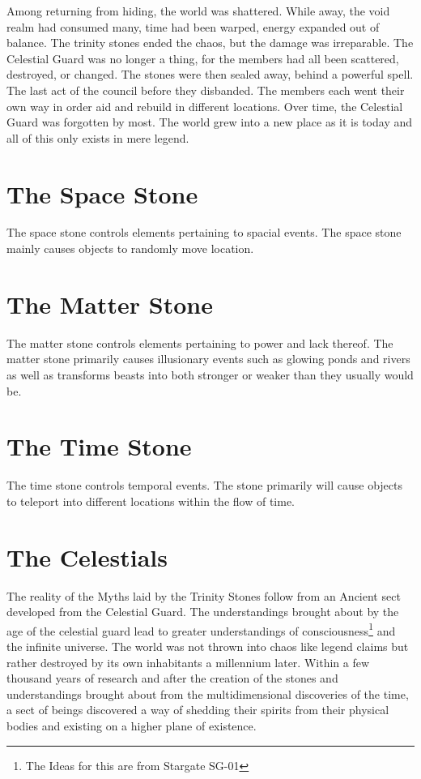 Among returning from hiding, the world was shattered. While away, the void realm had consumed many, time had been warped, energy expanded out of balance. The trinity stones ended the chaos, but the damage was irreparable. The Celestial Guard was no longer a thing, for the members had all been scattered, destroyed, or changed. The stones were then sealed away, behind a powerful spell. The last act of the council before they disbanded. The members each went their own way in order aid and rebuild in different locations. Over time, the Celestial Guard was forgotten by most. The world grew into a new place as it is today and all of this only exists in mere legend.  

\section{The Space Stone}

The space stone controls elements pertaining to spacial events. The space stone mainly causes objects to randomly move location.


\section{The Matter Stone}

The matter stone controls elements pertaining to power and lack thereof. The matter stone primarily causes illusionary events such as glowing ponds and rivers as well as transforms beasts into both stronger or weaker than they usually would be.

\section{The Time Stone}

The time stone controls temporal events. The stone primarily will cause objects to teleport into different locations within the flow of time.

\section{The Celestials}

The reality of the Myths laid by the Trinity Stones follow from an Ancient sect developed from the Celestial Guard. The understandings brought about by the age of the celestial guard lead to greater understandings of consciousness\footnote{The Ideas for this are from Stargate SG-01} and the infinite universe. The world was not thrown into chaos like legend claims but rather destroyed by its own inhabitants a millennium later. Within a few thousand years of research and after the creation of the stones and understandings brought about from the multidimensional discoveries of the time, a sect of beings discovered a way of shedding their spirits from their physical bodies and existing on a higher plane of existence. 

